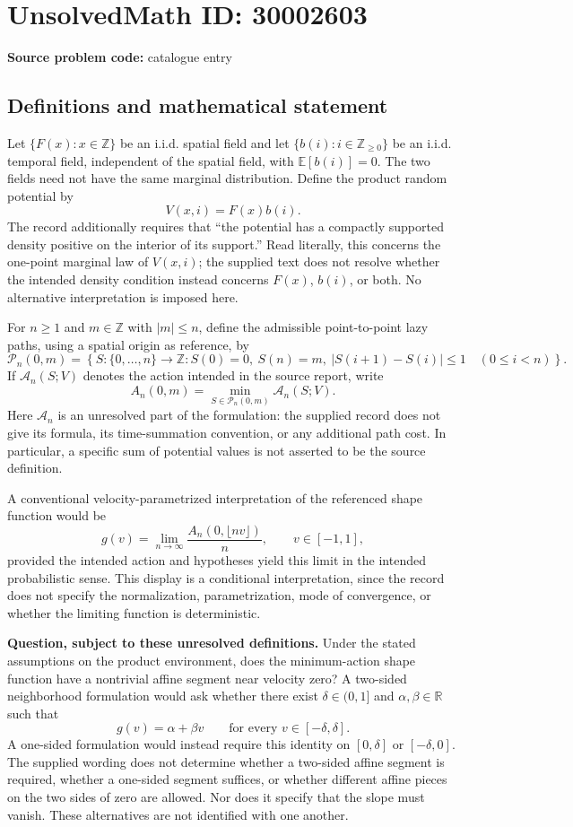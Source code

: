 \documentclass[11pt]{article}
\newcommand{\Z}{\mathbb{Z}}
\newcommand{\R}{\mathbb{R}}
\newcommand{\E}{\mathbb{E}}
\begin{document}
\section*{UnsolvedMath ID: 30002603}
\textbf{Source problem code:} catalogue entry
\subsection{Definitions and mathematical statement}
Let \(\{F(x):x\in\Z\}\) be an i.i.d. spatial field and let \(\{b(i):i\in\Z_{\geq0}\}\) be an i.i.d. temporal field, independent of the spatial field, with \(\E[b(i)]=0\). The two fields need not have the same marginal distribution. Define the product random potential by
\[
V(x,i)=F(x)b(i).
\]
The record additionally requires that ``the potential has a compactly supported density positive on the interior of its support.'' Read literally, this concerns the one-point marginal law of \(V(x,i)\); the supplied text does not resolve whether the intended density condition instead concerns \(F(x)\), \(b(i)\), or both. No alternative interpretation is imposed here.

For \(n\geq1\) and \(m\in\Z\) with \(|m|\leq n\), define the admissible point-to-point lazy paths, using a spatial origin as reference, by
\[
\mathcal P_n(0,m)=\left\{S:\{0,\ldots,n\}\to\Z:
S(0)=0,\ S(n)=m,\ |S(i+1)-S(i)|\leq1\quad(0\leq i<n)\right\}.
\]
If \(\mathcal A_n(S;V)\) denotes the action intended in the source report, write
\[
A_n(0,m)=\min_{S\in\mathcal P_n(0,m)}\mathcal A_n(S;V).
\]
Here \(\mathcal A_n\) is an unresolved part of the formulation: the supplied record does not give its formula, its time-summation convention, or any additional path cost. In particular, a specific sum of potential values is not asserted to be the source definition.

A conventional velocity-parametrized interpretation of the referenced shape function would be
\[
g(v)=\lim_{n\to\infty}\frac{A_n(0,\lfloor nv\rfloor)}{n},\qquad v\in[-1,1],
\]
provided the intended action and hypotheses yield this limit in the intended probabilistic sense. This display is a conditional interpretation, since the record does not specify the normalization, parametrization, mode of convergence, or whether the limiting function is deterministic.

\textbf{Question, subject to these unresolved definitions.} Under the stated assumptions on the product environment, does the minimum-action shape function have a nontrivial affine segment near velocity zero? A two-sided neighborhood formulation would ask whether there exist \(\delta\in(0,1]\) and \(\alpha,\beta\in\R\) such that
\[
g(v)=\alpha+\beta v\qquad\text{for every }v\in[-\delta,\delta].
\]
A one-sided formulation would instead require this identity on \([0,\delta]\) or \([-\delta,0]\). The supplied wording does not determine whether a two-sided affine segment is required, whether a one-sided segment suffices, or whether different affine pieces on the two sides of zero are allowed. Nor does it specify that the slope must vanish. These alternatives are not identified with one another.
\end{document}
